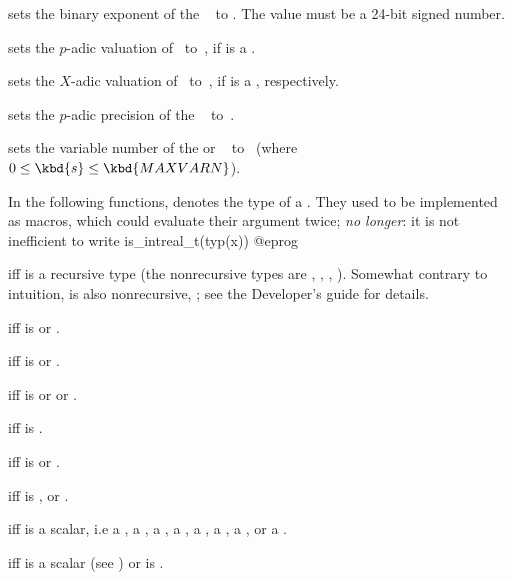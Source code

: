  sets the binary exponent of the
~ to . The value  must be a 24-bit signed
number.

 sets the $p$-adic valuation
of~ to~, if  is a .

 sets the $X$-adic valuation
of~ to~, if  is a , respectively.

 sets the $p$-adic precision of the
~ to~.

 sets the variable number of the 
or ~ to~ (where $0\le \kbd{s}\le\kbd{MAXVARN}$).

\label{se:typegroup}
In the following functions,  denotes the type of a .
They used to be implemented as macros, which could evaluate their argument
twice; \emph{no longer}: it is not inefficient to write
\bprog
  is_intreal_t(typ(x))
@eprog

  iff  is a recursive
type (the nonrecursive types are , ,
, ). Somewhat contrary to intuition,  is
also nonrecursive, ; see the Developer's guide for details.

  iff  is 
or .

  iff  is 
or .

  iff  is 
or  or .

  iff  is .

  iff  is 
or .

  iff  is , 
or .

  iff  is a scalar, i.e
a ,
a ,
a ,
a ,
a ,
a ,
a ,
or
a .

  iff  is a scalar (see
) or  is .

